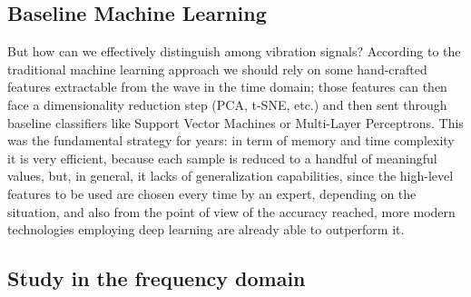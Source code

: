 \documentclass[../main.tex]{subfiles}
\begin{document}
\subsection{Baseline Machine Learning}

But how can we effectively distinguish among vibration signals? According to the traditional machine learning approach we should rely on some hand-crafted features extractable from the wave in the time domain; those features can then face a dimensionality reduction step (PCA, t-SNE, etc.) and then sent through baseline classifiers like Support Vector Machines or Multi-Layer Perceptrons. This was the fundamental strategy for years: in term of memory and time complexity it is very efficient, because each sample is reduced to a handful of meaningful values, but, in general, it lacks of generalization capabilities, since the high-level features to be used are chosen every time by an expert, depending on the situation, and also from the point of view of the accuracy reached, more modern technologies employing deep learning are already able to outperform it.

\subsection{Study in the frequency domain}
\end{document}
